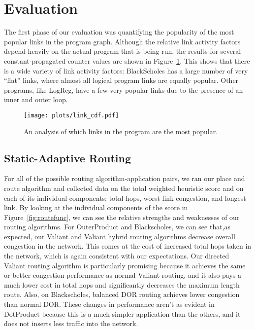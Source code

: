 \section{Evaluation}
\label{sec:results}
The first phase of our evaluation was quantifying the popularity of the most popular links in the program graph. Although the relative link activity factors depend heavily on the actual program that is being run, the results for several constant-propagated counter values are shown in Figure~\ref{fig:links}. This shows that there is a wide variety of link activity factors: BlackScholes has a large number of very ``flat'' links, where almost all logical program links are equally popular. Other programs, like LogReg, have a few very popular links due to the presence of an inner and outer loop.
\begin{figure}
\texttt{[image: plots/link\_cdf.pdf]}
\caption{An analysis of which links in the program are the most popular.}
\label{fig:links}
\end{figure}
\subsection{Static-Adaptive Routing}
For all of the possible routing algorithm-application pairs, we ran our place and route algorithm and collected data on the total weighted heuristic score and on each of its individual components: total hops, worst link congestion, and longest link.  By looking at the individual components of the score in Figure~\ref{fig:routefunc}, we can see the relative strengths and weaknesses of our routing algorithms. For OuterProduct and Blackscholes, we can see that,as expected, our Valiant and Valiant hybrid routing algorithms decrease overall congestion in the network. This comes at the cost of increased total hops taken in the network, which is again consistent with our expectations. Our directed Valiant routing algorithm is particularly promising because it achieves the same or better congestion performance as normal Valiant routing, and it also pays a much lower cost in total hops and significantly decreases the maximum length route.
Also, on Blackscholes, balanced DOR routing achieves lower congestion than normal DOR. These changes in performance aren't as evident in DotProduct because this is a much simpler application than the others, and it does not inserts less traffic into the network.

